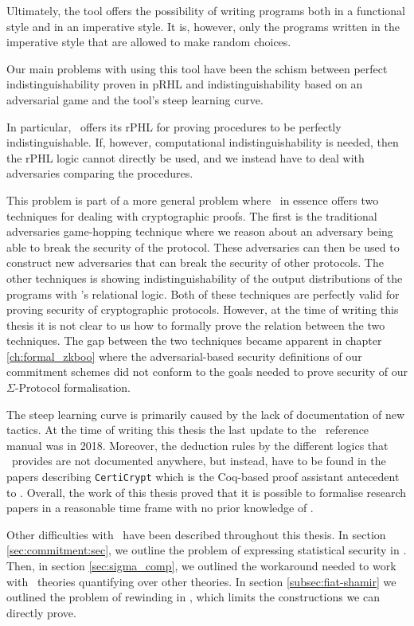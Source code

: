 Ultimately, the tool offers the possibility of writing programs both in a
functional style and in an imperative style. It is, however, only the programs
written in the imperative style that are allowed to make random choices.

Our main problems with using this tool have been the schism between perfect
indistinguishability proven in pRHL and indistinguishability based on an
adversarial game and the tool's steep learning curve.

In particular, \easycrypt\ offers its rPHL for proving procedures to be perfectly
indistinguishable. If, however, computational indistinguishability is needed, then
the rPHL logic cannot directly be used, and we instead have to deal with
adversaries comparing the procedures.

This problem is part of a more general problem where \easycrypt\ in essence
offers two techniques for dealing with cryptographic proofs. The first is the
traditional adversaries game-hopping technique where we reason about an
adversary being able to break the security of the protocol. These adversaries can
then be used to construct new adversaries that can break the security of other protocols.
The other techniques is showing indistinguishability of the output distributions
of the programs with \easycrypt's relational logic.
Both of these techniques are perfectly valid for proving security of
cryptographic protocols.
However, at the time of writing this thesis it is not
clear to us how to formally prove the relation between the two techniques.
The gap between the two techniques became apparent in chapter \ref{ch:formal_zkboo} where the
adversarial-based security definitions of our commitment schemes did not conform
to the goals needed to prove security of our $\Sigma$-Protocol formalisation.

The steep learning curve is primarily caused by the lack of documentation of new
tactics. At the time of writing this thesis the last update to the \easycrypt\
reference manual \cite{ec_refman} was in 2018. Moreover, the deduction rules by
the different logics that \easycrypt\ provides are not documented anywhere, but
instead, have to be found in the papers describing \texttt{CertiCrypt} which is
the Coq-based proof assistant antecedent to \easycrypt.
Overall, the work of this thesis proved that it is possible to formalise research papers in a
reasonable time frame with no prior knowledge of \easycrypt.

Other difficulties with \easycrypt\ have been described throughout this thesis.
In section \ref{sec:commitment:sec}, we outline the problem of expressing
statistical security in \easycrypt. Then, in section \ref{sec:sigma_comp}, we
outlined the workaround needed to work with \easycrypt\ theories quantifying
over other theories. In section \ref{subsec:fiat-shamir} we outlined the problem
of rewinding in \easycrypt, which limits the constructions we can directly prove.

